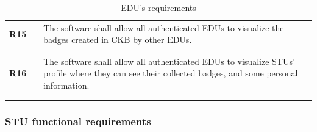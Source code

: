\begin{longtable}[H]{l l p{12cm}}
    \textbf{R15} & \vline & The software shall allow all authenticated EDUs to visualize the badges created in CKB by other EDUs.                                                                                                                                                                    \\
                 &        &                                                                                                                                                                                                                                                                          \\\hline & & \\
    \textbf{R16} & \vline & The software shall allow all authenticated EDUs to visualize STUs' profile where they can see their collected badges, and some personal information.                                                                                                                     \\
                 &        &                                                                                                                                                                                                                                                                          \\
    \hline
    \caption{EDU's requirements}
\end{longtable}

\subsubsection*{STU functional requirements}

